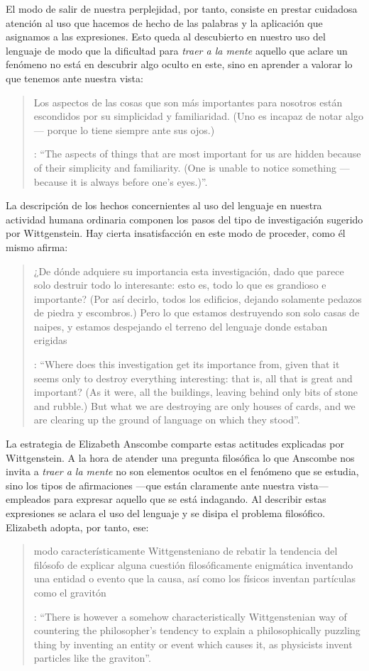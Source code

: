 El modo de salir de nuestra perplejidad, por tanto, consiste en prestar cuidadosa atención al uso que hacemos de hecho de las palabras y la aplicación que asignamos a las expresiones. Esto queda al descubierto en nuestro uso del lenguaje de modo que la dificultad para \emph{traer a la mente} aquello que aclare un fenómeno no está en descubrir algo oculto en este, sino en aprender a valorar lo que tenemos ante nuestra vista: \blockquote[{\Cite[\S129]{wittgenstein1953phiinv}}: \enquote{The aspects of things that are most important for us are hidden because of their simplicity and familiarity. (One is unable to notice something --- because it is always before one's eyes.)}.]{Los aspectos de las cosas que son más importantes para nosotros están escondidos por su simplicidad y familiaridad. (Uno es incapaz de notar algo --- porque lo tiene siempre ante sus ojos.)} La descripción de los hechos concernientes al uso del lenguaje en nuestra actividad humana ordinaria componen los pasos del tipo de investigación sugerido por Wittgenstein. Hay cierta insatisfacción en este modo de proceder, como él mismo afirma: \blockquote[{\Cite[\S118]{wittgenstein1953phiinv}}: \enquote{Where does this investigation get its importance from, given that it seems only to destroy everything interesting: that is, all that is great and important? (As it were, all the buildings, leaving behind only bits of stone and rubble.) But what we are destroying are only houses of cards, and we are clearing up the ground of language on which they stood}.]{¿De dónde adquiere su importancia esta investigación, dado que parece solo destruir todo lo interesante: esto es, todo lo que es grandioso e importante? (Por así decirlo, todos los edificios, dejando solamente pedazos de piedra y escombros.) Pero lo que estamos destruyendo son solo casas de naipes, y estamos despejando el terreno del lenguaje donde estaban erigidas}.

La estrategia de Elizabeth Anscombe comparte estas actitudes explicadas por Wittgenstein. A la hora de atender una pregunta filosófica lo que Anscombe nos invita a \emph{traer a la mente} no son elementos ocultos en el fenómeno que se estudia, sino los tipos de afirmaciones ---que están claramente ante nuestra vista--- empleados para expresar aquello que se está indagando. Al describir estas expresiones se aclara el uso del lenguaje y se disipa el problema filosófico. Elizabeth adopta, por tanto, ese: \blockquote[{\Cite[xix]{anscombe2011plato}}: \enquote{There is however a somehow characteristically Wittgenstenian way of countering the philosopher's tendency to explain a philosophically puzzling thing by inventing an entity or event which causes it, as physicists invent particles like the graviton}.]{modo característicamente Wittgensteniano de rebatir la tendencia del filósofo de explicar alguna cuestión filosóficamente enigmática inventando una entidad o evento que la causa, así como los físicos inventan partículas como el gravitón}.

